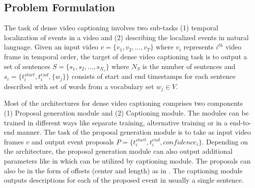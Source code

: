 \subsection{Problem Formulation}
\par The task of dense video captioning involves two sub-tasks (1) temporal localization of events in a video and (2) describing the localized events in natural language. Given an input video $v = \{v_1, v_2, ... , v_T \}$ where $v_i$ represents $i^{th}$ video frame in temporal order, the target of dense video captioning task is to output a set of sentences $S = \{s_1, s_2, ... , s_{N_s}\}$ where $N_S$ is the number of sentences and $s_i = \{t_i^{start}, t_i^{end}, \{w_j\} \}$ consists of start and end timestamps for each sentence described with set of words from a vocabulary set $w_j \in V$.
\par Most of the architectures for dense video captioning comprises two components (1) Proposal generation module and (2) Captioning module. The modules can be trained in different ways like separate training, alternative training or in a end-to-end manner. The task of the proposal generation module is to take as input video frames $v$ and output event proposals $P = \{t_i^{start}, t_i^{end}, confidence_i \}$. Depending on the architecture, the proposal generation module can also output additional parameters like in \cite{krishna2017densecaptioning, li2018jointly, wang2018bidirectional} which can be utilized by captioning module. The proposals can also be in the form of offsets (center and length) as in \cite{li2018jointly, iashin2020better, xu2018joint, deng2021sketch, zhou2018end}. The captioning module outputs descriptions for each of the proposed event in usually a single sentence.